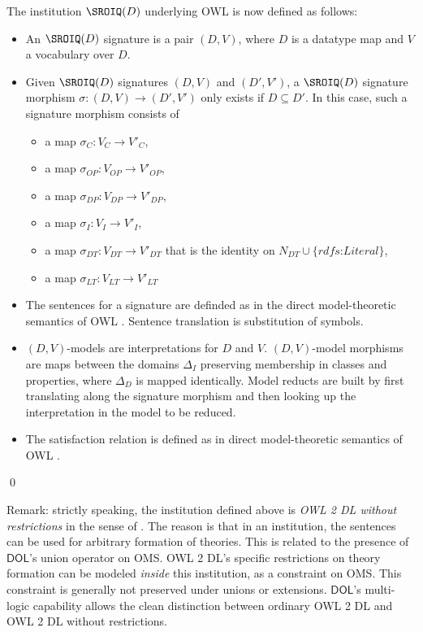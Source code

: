 \documentclass[10pt,fleqn,final]{scrreprt}
\newcommand*{\DOL}{\ensuremath{\mathsf{DOL}}\xspace}
\begin{document}
The institution $\SROIQ(D)$ underlying OWL is now defined as follows:
\begin{definition}
\begin{itemize}
\item An $\SROIQ(D)$ signature is a pair $(D,V)$, where $D$ is a
  datatype map and $V$ a vocabulary over $D$.
\item Given $\SROIQ(D)$ signatures $(D,V)$ and $(D',V')$, a
  $\SROIQ(D)$ signature morphism $\sigma\colon (D,V)\to(D',V')$ only
  exists if $D\subseteq D'$. In this case, such a signature morphism
  consists of
\begin{itemize}
\item a map $\sigma_C\colon V_{C}\to V'_{C}$,
\item a map $\sigma_{OP}\colon V_{OP}\to V'_{OP}$,
\item a map $\sigma_{DP}\colon V_{DP}\to V'_{DP}$,
\item a map $\sigma_I\colon V_{I}\to V'_{I}$,
\item a map $\sigma_{DT}\colon V_{DT}\to V'_{DT}$ that is the identity
on $N_{DT} \cup \{ \textit{rdfs:Literal} \}$,
\item a map $\sigma_{LT}\colon V_{LT}\to V'_{LT}$ 

\end{itemize}
\item The sentences for a signature are definded as in
the direct model-theoretic semantics of OWL \cite{w3c:owl2-direct-semantics}. Sentence translation is substitution of symbols.
\item  $(D,V)$-models are interpretations for $D$ and $V$. 
$(D,V)$-model morphisms are maps between the domains $\Delta_I$ preserving membership in classes and properties, where $\Delta_D$ is mapped identically. Model reducts are built by first translating along the signature morphism and then
looking up the interpretation in the model to be reduced.  
\item The satisfaction relation is defined as in direct model-theoretic semantics of OWL \cite{w3c:owl2-direct-semantics}.
\end{itemize}
\qed\end{definition}





Remark: strictly speaking, the institution defined above is
\emph{{OWL} 2 DL without restrictions} in the sense of
\cite{DBLP:conf/owled/SchneiderRS13}. The reason is that in an
institution, the sentences can be used for arbitrary formation of
theories. This is related to the presence of \DOL's union operator on
OMS.  OWL 2 DL's specific restrictions on theory formation can be
modeled \emph{inside} this institution, as a constraint on OMS.  This
constraint is generally not preserved under unions or
extensions. \DOL's multi-logic capability allows the clean distinction
between ordinary OWL 2 DL and {OWL} 2 DL without restrictions.
\end{document}
